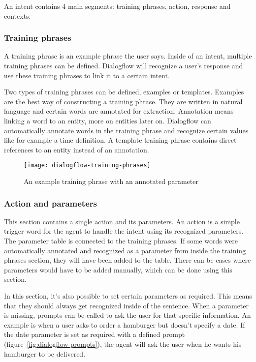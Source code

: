 An intent contains 4 main segments: training phrases, action, response and contexts.

\subsubsection{Training phrases}

A training phrase is an example phrase the user says. Inside of an intent, multiple training phrases can be defined. Dialogflow will recognize a user's response and use these training phrases to link it to a certain intent.

Two types of training phrases can be defined, examples or templates. Examples are the best way of constructing a training phrase. They are written in natural language and certain words are annotated for extraction. Annotation means linking a word to an entity, more on entities later on. Dialogflow can automatically annotate words in the training phrase and recognize certain values like for example a time definition. A template training phrase contains direct references to an entity instead of an annotation.

\begin{figure}[ht]
	\centering
	\texttt{[image: dialogflow-training-phrases]}
	\caption{An example training phrase with an annotated parameter}
	\label{fig:dialogflow-training-phrases}
\end{figure}

\subsubsection{Action and parameters}

This section contains a single action and its parameters. An action is a simple trigger word for the agent to handle the intent using its recognized parameters. The parameter table is connected to the training phrases. If some words were automatically annotated and recognized as a parameter from inside the training phrases section, they will have been added to the table. There can be cases where parameters would have to be added manually, which can be done using this section.

In this section, it's also possible to set certain parameters as required. This means that they should always get recognized inside of the sentence. When a parameter is missing, prompts can be called to ask the user for that specific information. An example is when a user asks to order a hamburger but doesn't specify a date. If the date parameter is set as required with a defined prompt (figure~\ref{fig:dialogflow-prompts}), the agent will ask the user when he wants his hamburger to be delivered.

